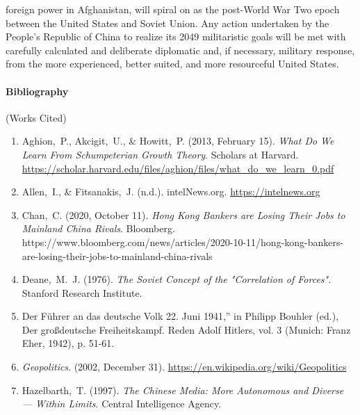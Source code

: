 \documentclass[12pt]{article}
\begin{document}
foreign power in Afghanistan, will spiral on as the post-World War Two epoch between the United States and Soviet Union. Any action undertaken by the People's Republic of China to realize its 2049 militaristic goals will be met with carefully calculated and deliberate diplomatic and, if necessary, military response, from the more experienced, better suited, and more resourceful United States.

\clearpage



\paragraph{Bibliography} (Works Cited)

\begin{enumerate}

    \item Aghion, P., Akcigit, U., & Howitt, P. (2013, February 15). \textit{What Do We Learn From Schumpeterian Growth Theory}. Scholars at Harvard. \\\href{https://scholar.harvard.edu/files/aghion/files/what\_do\_we\_learn\_0.pdf}{https://scholar.harvard.edu/files/aghion/files/what\_do\_we\_learn\_0.pdf}

  \item Allen, I., & Fitsanakis, J. (n.d.). intelNews.org. \href{https://intelnews.org}{https://intelnews.org}

  \item Chan, C. (2020, October 11). \textit{Hong Kong Bankers are Losing Their Jobs to Mainland China Rivals}. Bloomberg. https://www.bloomberg.com/news/articles/2020-10-11/hong-kong-bankers-are-losing-their-jobs-to-mainland-china-rivals

  \item Deane, M. J. (1976). \textit{The Soviet Concept of the "Correlation of Forces"}. Stanford Research Institute.

  \item Der Führer an das deutsche Volk 22. Juni 1941,” in Philipp Bouhler (ed.), Der großdeutsche Freiheitskampf. Reden Adolf Hitlers, vol. 3 (Munich: Franz Eher, 1942), p. 51-61.

  \item \textit{Geopolitics}. (2002, December 31). \href{https://en.wikipedia.org/wiki/Geopolitics}{https://en.wikipedia.org/wiki/Geopolitics}

  \item Hazelbarth, T. (1997). \textit{The Chinese Media: More Autonomous and Diverse — Within Limits}. Central Intelligence Agency.


\end{enumerate}
\end{document}
